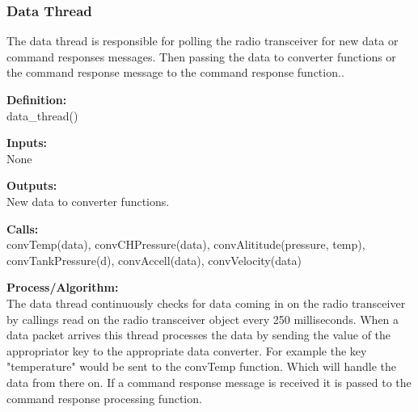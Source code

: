 \documentclass[10pt,draftclsnofoot,onecolumn,retainorgcmds]{IEEEtran}
\begin{document}
\subsubsection{Data Thread}
The data thread is responsible for polling the radio transceiver for new data or command responses messages. Then passing the data to converter functions or the command response message to the command response function.. \par
{\bf Definition:} \\ 
data\_thread() \par
{\bf Inputs:} \\  None \par
{\bf Outputs:} \\ New data to converter functions. \par
{\bf Calls:} \\ convTemp(data), convCHPressure(data), convAlititude(pressure, temp), convTankPressure(d), convAccell(data), convVelocity(data) \par
{\bf Process/Algorithm:} \\
The data thread continuously checks for data coming in on the radio transceiver by callings read on the radio transceiver object every 250 milliseconds. When a data packet arrives this thread processes the data by sending the value of the appropriator key to the appropriate data converter. For example the key "temperature" would be sent to the convTemp function. Which will handle the data from there on. If a command response message is received it is passed to the command response processing function.  \par
\end{document}

